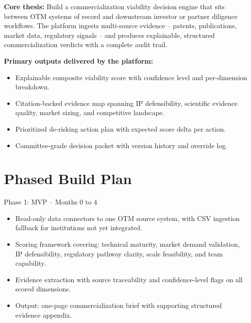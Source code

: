 \documentclass[11pt]{article}
\begin{document}
\begin{insightbox}
  \textbf{Core thesis:} Build a commercialization viability decision engine that
  sits between OTM systems of record and downstream investor or partner diligence
  workflows. The platform ingests multi-source evidence -- patents, publications,
  market data, regulatory signals -- and produces explainable, structured
  commercialization verdicts with a complete audit trail.
\end{insightbox}

\textbf{Primary outputs delivered by the platform:}
\begin{itemize}
  \item Explainable composite viability score with confidence level and
        per-dimension breakdown.
  \item Citation-backed evidence map spanning IP defensibility, scientific
        evidence quality, market sizing, and competitive landscape.
  \item Prioritized de-risking action plan with expected score delta per action.
  \item Committee-grade decision packet with version history and override log.
\end{itemize}

\section{Phased Build Plan}

\vspace{6pt}

\begin{phasebox}{Phase 1: MVP \normalfont\textcolor{midgray}{\small -- Months 0 to 4}}
\begin{itemize}
  \item Read-only data connectors to one OTM source system, with CSV ingestion
        fallback for institutions not yet integrated.
  \item Scoring framework covering: technical maturity, market demand validation,
        IP defensibility, regulatory pathway clarity, scale feasibility, and
        team capability.
  \item Evidence extraction with source traceability and confidence-level flags
        on all scored dimensions.
  \item Output: one-page commercialization brief with supporting structured
        evidence appendix.
\end{itemize}
\end{phasebox}
\end{document}
